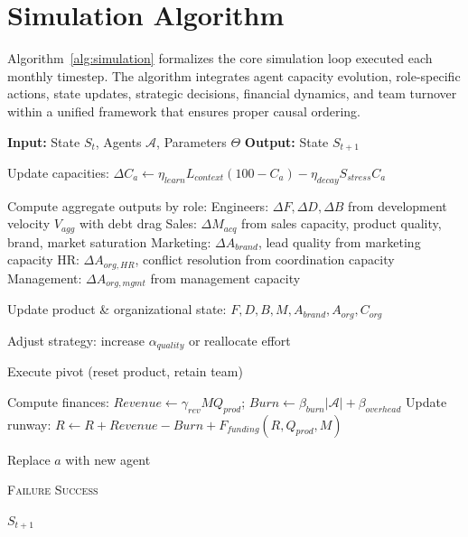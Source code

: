 \documentclass[alpha-refs]{wiley-article}
\begin{document}
\section{Simulation Algorithm}
\label{app:algorithm}

Algorithm~\ref{alg:simulation} formalizes the core simulation loop executed each monthly timestep. The algorithm integrates agent capacity evolution, role-specific actions, state updates, strategic decisions, financial dynamics, and team turnover within a unified framework that ensures proper causal ordering.

\begin{algorithm}[!htbp]
\caption{Monthly Organizational Simulation Step}
\label{alg:simulation}
\begin{algorithmic}[1]
\State \textbf{Input:} State $S_t$, Agents $\mathcal{A}$, Parameters $\Theta$
\State \textbf{Output:} State $S_{t+1}$

    \State Update capacities: $\Delta C_a \leftarrow \eta_{learn} L_{context}(100-C_a) - \eta_{decay} S_{stress} C_a$
\EndFor

\State Compute aggregate outputs by role:
\State \quad Engineers: $\Delta F, \Delta D, \Delta B$ from development velocity $V_{agg}$ with debt drag
\State \quad Sales: $\Delta M_{acq}$ from sales capacity, product quality, brand, market saturation
\State \quad Marketing: $\Delta A_{brand}$, lead quality from marketing capacity
\State \quad HR: $\Delta A_{org,HR}$, conflict resolution from coordination capacity
\State \quad Management: $\Delta A_{org,mgmt}$ from management capacity

\State Update product \& organizational state: $F, D, B, M, A_{brand}, A_{org}, C_{org}$

    \State Adjust strategy: increase $\alpha_{quality}$ or reallocate effort
\EndIf

    \State Execute pivot (reset product, retain team)
\EndIf

\State Compute finances: $Revenue \leftarrow \gamma_{rev} M Q_{prod}$; $Burn \leftarrow \beta_{burn}|\mathcal{A}| + \beta_{overhead}$
\State Update runway: $R \leftarrow R + Revenue - Burn + F_{funding}(R, Q_{prod}, M)$

        \State Replace $a$ with new agent
    \EndIf
\EndFor

 \Return \textsc{Failure}
 \Return \textsc{Success}
\EndIf

\State \Return $S_{t+1}$
\end{algorithmic}
\end{algorithm}
\end{document}
